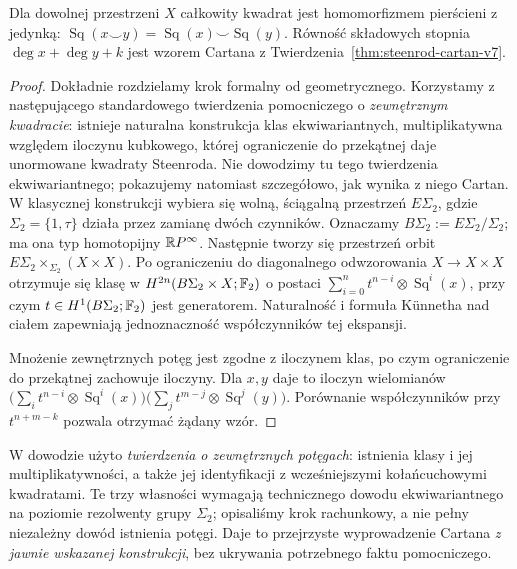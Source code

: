 \begin{twierdzenie}
\label{thm:cartan-v8}
Dla dowolnej przestrzeni $X$ całkowity kwadrat jest
homomorfizmem pierścieni z jedynką:
$\operatorname{Sq}(x\smile y)=\operatorname{Sq}(x)\smile\operatorname{Sq}(y)$.
Równość składowych stopnia $\deg x+\deg y+k$ jest
wzorem Cartana z Twierdzenia~\ref{thm:steenrod-cartan-v7}.
\end{twierdzenie}
\begin{proof}
Dokładnie rozdzielamy krok formalny od geometrycznego.
Korzystamy z następującego standardowego twierdzenia
pomocniczego o \emph{zewnętrznym kwadracie}: istnieje
naturalna konstrukcja klas ekwiwariantnych, multiplikatywna
względem iloczynu kubkowego, której ograniczenie do
przekątnej daje unormowane kwadraty Steenroda.
Nie dowodzimy tu tego twierdzenia ekwiwariantnego;
pokazujemy natomiast szczegółowo, jak wynika z niego Cartan.
W klasycznej konstrukcji wybiera się wolną, ściągalną
przestrzeń $E\Sigma_2$, gdzie
$\Sigma_2=\{1,\tau\}$ działa przez zamianę dwóch czynników.
Oznaczamy $B\Sigma_2:=E\Sigma_2/\Sigma_2$;
ma ona typ homotopijny $\mathbb{R} P^\infty$.
Następnie tworzy się przestrzeń orbit
$E\Sigma_2\times_{\Sigma_2}(X\times X)$.
Po ograniczeniu do diagonalnego odwzorowania
$X\to X\times X$ otrzymuje się klasę w
$H^{2n}(B\Sigma_2\times X;\mathbb{F}_2)$ o postaci
$\sum_{i=0}^n t^{n-i}\otimes\operatorname{Sq}^i(x)$,
przy czym $t\in H^1(B\Sigma_2;\mathbb{F}_2)$ jest generatorem.
Naturalność i formuła Künnetha nad ciałem zapewniają jednoznaczność
współczynników tej ekspansji.

Mnożenie zewnętrznych potęg jest zgodne z iloczynem klas,
po czym ograniczenie do przekątnej zachowuje iloczyny.
Dla $x,y$ daje to iloczyn wielomianów
$\bigl(\sum_i t^{n-i}\otimes\operatorname{Sq}^i(x)\bigr)
 \bigl(\sum_j t^{m-j}\otimes\operatorname{Sq}^j(y)\bigr)$.
Porównanie współczynników przy $t^{n+m-k}$
pozwala otrzymać żądany wzór.
\end{proof}
\begin{uwaga}
W dowodzie użyto \emph{twierdzenia o zewnętrznych potęgach}:
istnienia klasy i jej multiplikatywności, a także jej
identyfikacji z wcześniejszymi kołańcuchowymi kwadratami.
Te trzy własności wymagają technicznego dowodu ekwiwariantnego
na poziomie rezolwenty grupy $\Sigma_2$; opisaliśmy krok rachunkowy,
a nie pełny niezależny dowód istnienia potęgi. Daje to przejrzyste
wyprowadzenie Cartana \emph{z jawnie wskazanej konstrukcji},
bez ukrywania potrzebnego faktu pomocniczego.
\end{uwaga}

